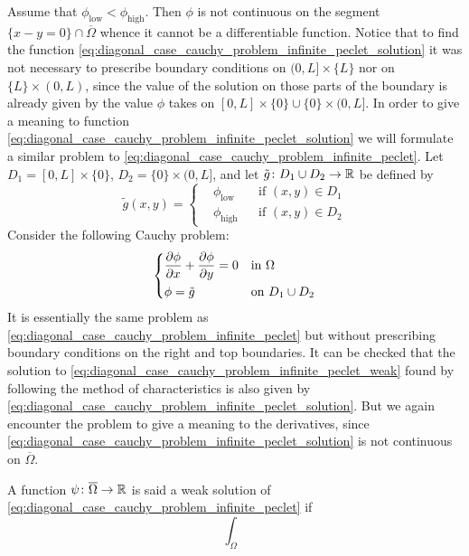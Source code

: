 Assume that $\phi_\text{low} < \phi_\text{high}$. Then $\phi$ is not continuous on the segment $\{ x - y = 0 \} \cap \overline{\Omega}$ whence it cannot be a differentiable function. Notice that to find the function \eqref{eq:diagonal_case_cauchy_problem_infinite_peclet_solution} it was not necessary to prescribe boundary conditions on $(0, L] \times \{ L \}$ nor on $\{ L \} \times (0, L)$, since the value of the solution on those parts of the boundary is already given by the value $\phi$ takes on $[0, L] \times \{ 0 \} \cup \{ 0 \} \times (0, L]$. In order to give a meaning to function \eqref{eq:diagonal_case_cauchy_problem_infinite_peclet_solution} we will formulate a similar problem to \eqref{eq:diagonal_case_cauchy_problem_infinite_peclet}. Let $D_1 = [0, L] \times \{ 0 \}$, $D_2 = \{ 0 \} \times (0, L]$, and let $\tilde{g} \colon D_1 \cup D_2 \rightarrow \mathbb{R}$ be defined by
\begin{equation}
	\tilde{g}(x,y) = 
	\left\{
	\begin{aligned}
		&\phi_\text{low}	& &\text{if } (x,y) \in D_1 \\
		&\phi_\text{high} 	& &\text{if } (x,y) \in D_2
	\end{aligned}
	\right.
\end{equation}
Consider the following Cauchy problem:
\begin{equation} \label{eq:diagonal_case_cauchy_problem_infinite_peclet_weak}
	\left\{
	\begin{aligned}
		&\pdv{\phi}{x} + \pdv{\phi}{y} = 0 &
		&\text{in } \Omega \\
		&\phi = \tilde{g} &
		&\text{on } D_1 \cup D_2
	\end{aligned}
	\right.
\end{equation}
It is essentially the same problem as \eqref{eq:diagonal_case_cauchy_problem_infinite_peclet} but without prescribing boundary conditions on the right and top boundaries. It can be checked that the solution to \eqref{eq:diagonal_case_cauchy_problem_infinite_peclet_weak} found by following the method of characteristics is also given by \eqref{eq:diagonal_case_cauchy_problem_infinite_peclet_solution}. But we again encounter the problem to give a meaning to the derivatives, since \eqref{eq:diagonal_case_cauchy_problem_infinite_peclet_solution} is not continuous on $\overline{\Omega}$. 

\begin{definition}
	A function $\psi \colon \overline{\Omega} \rightarrow \mathbb{R}$ is said a weak solution of \eqref{eq:diagonal_case_cauchy_problem_infinite_peclet} if 
	\[
		\int_\Omega 
	\]
\end{definition}


